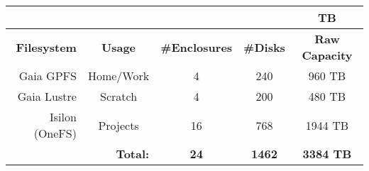 % 
% 
% 


\begin{table}[h]
  \vspace{-2ex}
  \centering\scriptsize
  \begin{tabular}{|r||c|c|c|c|}
    \multicolumn{4}{c}{}  & \multicolumn{1}{c}{TB}\\\hline
    \rowcolor{lightgray}
    \textbf{Filesystem}     & \textbf{Usage}  & \textbf{\#Enclosures} & \textbf{\#Disks} & \textbf{Raw Capacity} \\ \hline \hline
    Gaia GPFS               & Home/Work       & 4                     & 240              & 960 TB                  \\
    Gaia Lustre             & Scratch         & 4                     & 200              & 480 TB                  \\
    Isilon (OneFS)     & Projects        & 16                    & 768              & 1944 TB                 \\ \hline
    \multicolumn{2}{r}{\textbf{Total:}} & \multicolumn{1}{c}{\textbf{24}} & \multicolumn{1}{c}{\textbf{1462}} & \multicolumn{1}{c}{\textbf{3384 TB}}       \\ 
  \end{tabular}
\end{table}



% 
